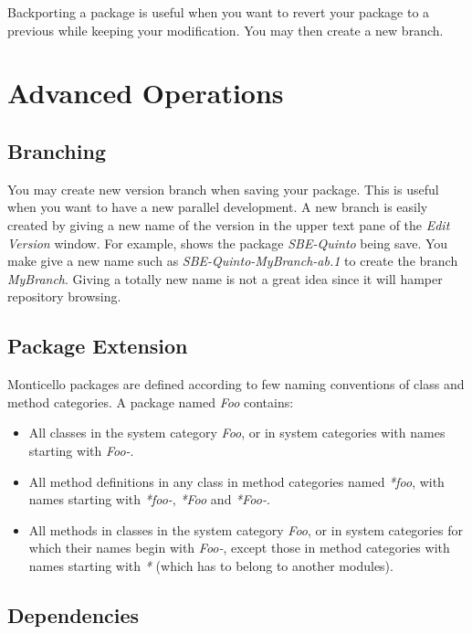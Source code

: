 \documentclass[a4paper,10pt,twoside]{book}
\begin{document}
Backporting a package is useful when you want to revert your package to a previous while keeping your modification. You may then create a new branch. 



\section{Advanced Operations} 

\subsection{Branching}

You may create new version branch when saving your package. This is useful when you want to have a new parallel development. A new branch is easily created by giving a new name of the version in the upper text pane of the \emph{Edit Version} window. For example,  shows the package \emph{SBE-Quinto} being save. You make give a new name such as \emph{SBE-Quinto-MyBranch-ab.1} to create the branch \emph{MyBranch}. Giving a totally new name is not a great idea since it will hamper repository browsing.

\subsection{Package Extension}  
Monticello packages are defined according to few naming conventions of class and method categories. A package named \emph{Foo} contains:

\begin{itemize}
\item All classes in the system category \emph{Foo}, or in system categories with names starting with \emph{Foo-}.
\item All method definitions in any class in method categories named \emph{*foo}, with names starting with \emph{*foo-}, \emph{*Foo} and \emph{*Foo-}.
\item All methods in classes in the system category \emph{Foo}, or in system categories for which their names begin with \emph{Foo-}, except those in method categories with names starting with \emph{*} (which has to belong to another modules).
\end{itemize}

\subsection{Dependencies}
\end{document}
